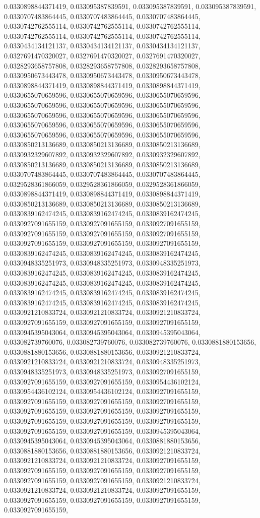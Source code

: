 \documentclass[
  ,man]{apa6}
\begin{document}
0.0330898844371419, 0.033095387839591, 0.033095387839591, 0.033095387839591, 0.0330707483864445, 0.0330707483864445, 0.0330707483864445, 0.0330742762555114, 0.0330742762555114, 0.0330742762555114, 0.0330742762555114, 0.0330742762555114, 0.0330742762555114, 0.0330434134121137, 0.0330434134121137, 0.0330434134121137, 0.0327691470320027, 0.0327691470320027, 0.0327691470320027, 0.0328293658757808, 0.0328293658757808, 0.0328293658757808, 0.0330950673443478, 0.0330950673443478, 0.0330950673443478, 0.0330898844371419,
0.0330898844371419, 0.0330898844371419, 0.0330655070659596, 0.0330655070659596, 0.0330655070659596, 0.0330655070659596, 0.0330655070659596, 0.0330655070659596, 0.0330655070659596, 0.0330655070659596, 0.0330655070659596, 0.0330655070659596, 0.0330655070659596, 0.0330655070659596, 0.0330655070659596, 0.0330655070659596, 0.0330655070659596, 0.0330850213136689, 0.0330850213136689, 0.0330850213136689, 0.0330932329607892, 0.0330932329607892, 0.0330932329607892, 0.0330850213136689, 0.0330850213136689, 0.0330850213136689,
0.0330707483864445, 0.0330707483864445, 0.0330707483864445, 0.0329528361866059, 0.0329528361866059, 0.0329528361866059, 0.0330898844371419, 0.0330898844371419, 0.0330898844371419, 0.0330850213136689, 0.0330850213136689, 0.0330850213136689, 0.0330839162474245, 0.0330839162474245, 0.0330839162474245, 0.0330927091655159, 0.0330927091655159, 0.0330927091655159, 0.0330927091655159, 0.0330927091655159, 0.0330927091655159, 0.0330927091655159, 0.0330927091655159, 0.0330927091655159, 0.0330839162474245, 0.0330839162474245,
0.0330839162474245, 0.0330948335251973, 0.0330948335251973, 0.0330948335251973, 0.0330839162474245, 0.0330839162474245, 0.0330839162474245, 0.0330839162474245, 0.0330839162474245, 0.0330839162474245, 0.0330839162474245, 0.0330839162474245, 0.0330839162474245, 0.0330839162474245, 0.0330839162474245, 0.0330839162474245, 0.0330921210833724, 0.0330921210833724, 0.0330921210833724, 0.0330927091655159, 0.0330927091655159, 0.0330927091655159, 0.0330945395043064, 0.0330945395043064, 0.0330945395043064, 0.033082739760076,
0.033082739760076, 0.033082739760076, 0.0330881880153656, 0.0330881880153656, 0.0330881880153656, 0.0330921210833724, 0.0330921210833724, 0.0330921210833724, 0.0330948335251973, 0.0330948335251973, 0.0330948335251973, 0.0330927091655159, 0.0330927091655159, 0.0330927091655159, 0.0330954436102124, 0.0330954436102124, 0.0330954436102124, 0.0330927091655159, 0.0330927091655159, 0.0330927091655159, 0.0330927091655159, 0.0330927091655159, 0.0330927091655159, 0.0330927091655159, 0.0330927091655159, 0.0330927091655159,
0.0330927091655159, 0.0330927091655159, 0.0330927091655159, 0.0330945395043064, 0.0330945395043064, 0.0330945395043064, 0.0330881880153656, 0.0330881880153656, 0.0330881880153656, 0.0330921210833724, 0.0330921210833724, 0.0330921210833724, 0.0330927091655159, 0.0330927091655159, 0.0330927091655159, 0.0330927091655159, 0.0330927091655159, 0.0330927091655159, 0.0330921210833724, 0.0330921210833724, 0.0330921210833724, 0.0330927091655159, 0.0330927091655159, 0.0330927091655159, 0.0330927091655159, 0.0330927091655159,
\end{document}
